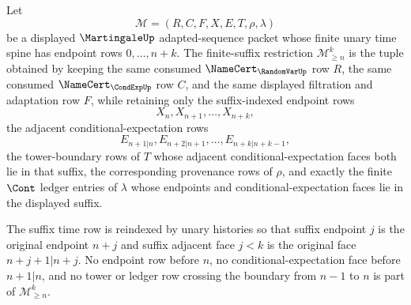 \begin{definition}
\label{def:martingale-finite-suffix-restriction}
Let
$$
\mathcal{M}=(R,C,F,X,E,T,\rho,\lambda)
$$
be a displayed $\MartingaleUp$ adapted-sequence packet whose finite unary time spine has endpoint rows $0,\ldots,n+k$. The finite-suffix restriction $\mathcal{M}_{\ge n}^{k}$ is the tuple obtained by keeping the same consumed $\NameCert_{\RandomVarUp}$ row $R$, the same consumed $\NameCert_{\CondExpUp}$ row $C$, and the same displayed filtration and adaptation row $F$, while retaining only the suffix-indexed endpoint rows
$$
X_n,X_{n+1},\ldots,X_{n+k},
$$
the adjacent conditional-expectation rows
$$
E_{n+1|n},E_{n+2|n+1},\ldots,E_{n+k|n+k-1},
$$
the tower-boundary rows of $T$ whose adjacent conditional-expectation faces both lie in that suffix, the corresponding provenance rows of $\rho$, and exactly the finite $\Cont$ ledger entries of $\lambda$ whose endpoints and conditional-expectation faces lie in the displayed suffix.

The suffix time row is reindexed by unary histories so that suffix endpoint $j$ is the original endpoint $n+j$ and suffix adjacent face $j<k$ is the original face $n+j+1|n+j$. No endpoint row before $n$, no conditional-expectation face before $n+1|n$, and no tower or ledger row crossing the boundary from $n-1$ to $n$ is part of $\mathcal{M}_{\ge n}^{k}$.
\end{definition}

